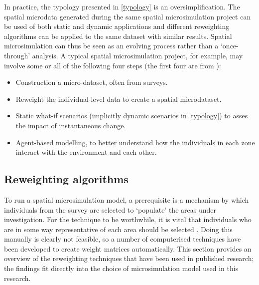 In practice, the typology presented in \cref{typology} is an
oversimplification. The spatial microdata generated during the same spatial
microsimulation project can be used of both static and dynamic applications and
different reweighting algorithms can be applied to the same dataset with
similar results. Spatial microsimulation can thus be seen as an evolving
process rather than a `once-through' analysis. A typical spatial microsimulation
project, for example, may involve some or all of the following four steps
(the first four are from \citealp{ballas2003microsimulation-30-years}):
\begin{itemize}
 \item Construction a micro-dataset, often from surveys.
 \item Reweight the individual-level data to create a spatial microdataset.
 \item Static what-if scenarios (implicitly dynamic scenarios in
\cref{typology}) to asses the impact of instantaneous change.
 \item Agent-based modelling, to better understand how the individuals in each
zone interact with the environment and each other.
\end{itemize}

% 

\subsection{Reweighting algorithms} %
To run a spatial microsimulation model, a prerequisite is a mechanism by
which individuals from the survey are selected to `populate' the areas under
investigation. For the technique to be worthwhile, it is vital that individuals
who are in some way representative of each area should be selected
\citep{Ballas2005}⁠. Doing this manually is clearly not feasible, so a number
of computerised techniques have been developed to create weight matrices
automatically. This section provides an overview of the reweighting techniques
that have been used in published research; the findings fit directly into the
choice of microsimulation model used in this research. %

